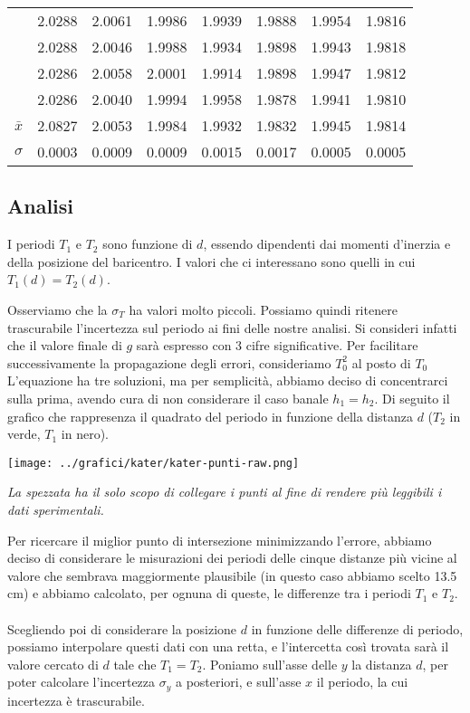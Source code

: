 \begin{center}
\begin{tabular}{*{8}{c}}
&2.0288&2.0061&1.9986 &1.9939 & 1.9888 & 1.9954 & 1.9816 \\
&2.0288&2.0046&1.9988 &1.9934 & 1.9898 & 1.9943 & 1.9818 \\
&2.0286&2.0058&2.0001 &1.9914 & 1.9898 & 1.9947 & 1.9812  \\
&2.0286&2.0040&1.9994 &1.9958 & 1.9878 & 1.9941 & 1.9810 \\
 \midrule
$\bar{x}$& 2.0827 & 2.0053 & 1.9984 & 1.9932 & 1.9832 & 1.9945 & 1.9814\\
$\sigma$ & 0.0003 & 0.0009 & 0.0009 & 0.0015 & 0.0017 & 0.0005 & 0.0005\\
\bottomrule
\end{tabular}
\end{center}

\subsection{Analisi}
I periodi $T_1$ e $T_2$ sono funzione di $d$, essendo dipendenti dai momenti d'inerzia e della posizione del baricentro. I valori che ci interessano sono quelli in cui $T_1(d) = T_2(d)$.

Osserviamo che la $\sigma_T$ ha valori molto piccoli. Possiamo quindi ritenere trascurabile l'incertezza sul periodo ai fini delle nostre analisi. Si consideri infatti che il valore finale di $g$ sarà espresso con 3 cifre significative. Per facilitare successivamente la propagazione degli errori, consideriamo $T^2_{0}$ al posto di $T_0$
\\

L'equazione ha tre soluzioni, ma per semplicità, abbiamo deciso di concentrarci sulla prima, avendo cura di non considerare il caso banale $h_1=h_2$. Di seguito il grafico che rappresenza il quadrato del periodo in funzione della distanza $d$ ($T_2$ in verde, $T_1$ in nero).


\begin{center}
\texttt{[image: ../grafici/kater/kater-punti-raw.png]}

\textit{La spezzata ha il solo scopo di collegare i punti al fine di rendere più leggibili i dati sperimentali.}
\end{center}

Per ricercare il miglior punto di intersezione minimizzando l'errore, abbiamo deciso di considerare le misurazioni dei periodi delle cinque distanze più vicine al valore che sembrava maggiormente plausibile (in questo caso abbiamo scelto 13.5 cm) e abbiamo calcolato, per ognuna di queste, le differenze tra i periodi $T_1$ e $T_2$.\\
\\
Scegliendo poi di considerare la posizione $d$ in funzione delle differenze di periodo, possiamo interpolare questi dati con una retta, e l'intercetta così trovata sarà il valore cercato di $d$ tale che $T_1 = T_2$. Poniamo sull'asse delle $y$ la distanza $d$, per poter calcolare l'incertezza $\sigma_y$ a posteriori, e sull'asse $x$ il periodo, la cui incertezza è trascurabile. 


